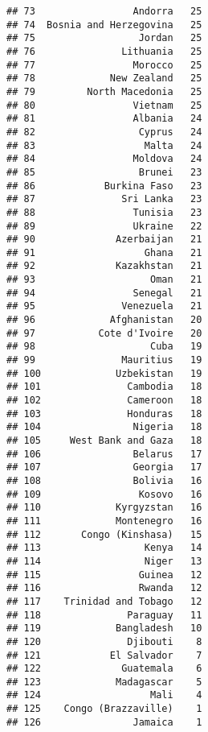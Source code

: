 \documentclass[]{article}
\newenvironment{Shaded}{\begin{snugshade}}{\end{snugshade}}
\newcommand{\KeywordTok}[1]{\textcolor[rgb]{0.13,0.29,0.53}{\textbf{{#1}}}}
\newcommand{\DecValTok}[1]{\textcolor[rgb]{0.00,0.00,0.81}{{#1}}}
\newcommand{\StringTok}[1]{\textcolor[rgb]{0.31,0.60,0.02}{{#1}}}
\newcommand{\CommentTok}[1]{\textcolor[rgb]{0.56,0.35,0.01}{\textit{{#1}}}}
\newcommand{\NormalTok}[1]{{#1}}
\begin{document}
\begin{verbatim}
## 73                 Andorra   25
## 74  Bosnia and Herzegovina   25
## 75                  Jordan   25
## 76               Lithuania   25
## 77                 Morocco   25
## 78             New Zealand   25
## 79         North Macedonia   25
## 80                 Vietnam   25
## 81                 Albania   24
## 82                  Cyprus   24
## 83                   Malta   24
## 84                 Moldova   24
## 85                  Brunei   23
## 86            Burkina Faso   23
## 87               Sri Lanka   23
## 88                 Tunisia   23
## 89                 Ukraine   22
## 90              Azerbaijan   21
## 91                   Ghana   21
## 92              Kazakhstan   21
## 93                    Oman   21
## 94                 Senegal   21
## 95               Venezuela   21
## 96             Afghanistan   20
## 97           Cote d'Ivoire   20
## 98                    Cuba   19
## 99               Mauritius   19
## 100             Uzbekistan   19
## 101               Cambodia   18
## 102               Cameroon   18
## 103               Honduras   18
## 104                Nigeria   18
## 105     West Bank and Gaza   18
## 106                Belarus   17
## 107                Georgia   17
## 108                Bolivia   16
## 109                 Kosovo   16
## 110             Kyrgyzstan   16
## 111             Montenegro   16
## 112       Congo (Kinshasa)   15
## 113                  Kenya   14
## 114                  Niger   13
## 115                 Guinea   12
## 116                 Rwanda   12
## 117    Trinidad and Tobago   12
## 118               Paraguay   11
## 119             Bangladesh   10
## 120               Djibouti    8
## 121            El Salvador    7
## 122              Guatemala    6
## 123             Madagascar    5
## 124                   Mali    4
## 125    Congo (Brazzaville)    1
## 126                Jamaica    1
\end{verbatim}

\begin{Shaded}
\end{Shaded}
\end{document}

